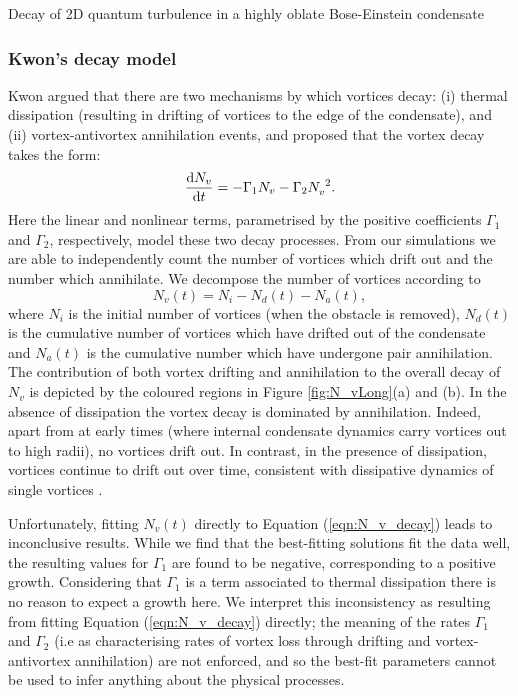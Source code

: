 \begin{chapter}{\label{cha:shin}Decay of 2D quantum turbulence in a highly oblate Bose-Einstein condensate}
\subsubsection{Kwon's decay model}\label{kwon_fitting}
Kwon {\etal}\citep{kwon_moon_14} argued that there are two mechanisms 
by which vortices decay: (i) thermal dissipation
(resulting in drifting of vortices to the edge of the condensate),
and (ii) vortex-antivortex annihilation events, and proposed
that the vortex decay takes the form:
\begin{equation}
\frac{{\rm d}N_v}{{\rm d}t}= - \Gamma_1 N_v - \Gamma_2 N_v^{~2}.
\label{eqn:N_v_decay}
\end{equation}
Here the linear and nonlinear terms, parametrised by the positive
coefficients $\Gamma_1$ and $\Gamma_2$, respectively, model
these two decay processes.  From our simulations we are able to independently count the number of vortices which drift out and the number which annihilate.  
We decompose the number of vortices according to 
\begin{equation}
  N_v(t) = N_i - N_d(t) - N_a(t),
\label{eqn:N_v_decomp}
\end{equation}
where $N_i$ is the initial number of vortices (when the obstacle is removed), $N_d(t)$ is the cumulative number of vortices which have drifted out of the condensate and $N_a(t)$ is the cumulative number which have undergone pair annihilation.
The contribution of both vortex drifting and annihilation to the overall decay of $N_v$ is depicted by the coloured regions in Figure \ref{fig:N_vLong}(a) and (b).  In the absence of dissipation  the vortex decay is dominated by annihilation.  Indeed, apart from at early times (where internal condensate dynamics carry vortices out to high radii), no vortices drift out.  In contrast, in the presence of dissipation, vortices continue to drift out over time, consistent with dissipative dynamics of single vortices \citep{allen_zaremba_13}.

Unfortunately, fitting $N_v(t)$ directly to Equation (\ref{eqn:N_v_decay}) leads to inconclusive results. While we find that the best-fitting solutions fit the data well, the resulting values for $\Gamma_1$ are found to be negative, corresponding to a positive growth. Considering that $\Gamma_1$ is a term associated to thermal dissipation there is no reason to expect a growth here. We interpret this inconsistency as resulting from fitting Equation (\ref{eqn:N_v_decay}) directly; the meaning of the rates $\Gamma_1$ and $\Gamma_2$ (i.e as characterising rates of vortex loss through drifting and vortex-antivortex annihilation) are not enforced, and so the best-fit parameters cannot be used to infer anything about the physical processes.


\end{chapter}

